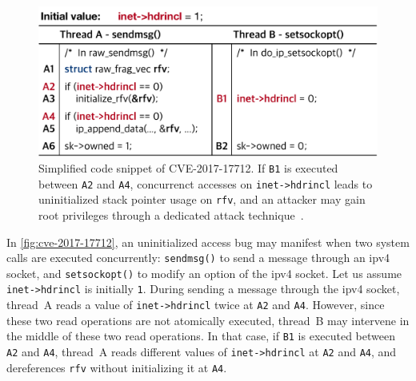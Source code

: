 %
\begin{figure}[t]
  \centering
  \includegraphics[width=0.85\linewidth]{fig/cve-2017-10661.pdf}
  \caption{Simplified code snippet of CVE-2017-17712. If \texttt{B1}
    is executed between \texttt{A2} and \texttt{A4}, concurrenct
    accesses on \texttt{inet->hdrincl} leads to uninitialized stack
    pointer usage on \texttt{rfv}, and an attacker may gain root
    privileges through a dedicated attack
    technique~\cite{stackspray}.}
  \label{fig:cve-2017-17712}
  \vspace{-8pt}
\end{figure}
%
In \autoref{fig:cve-2017-17712}, an uninitialized access bug may
manifest when two system calls are executed concurrently:
\texttt{sendmsg()} to send a message through an ipv4 socket, and
\texttt{setsockopt()} to modify an option of the ipv4 socket.
Let us assume \texttt{inet->hdrincl} is initially \texttt{1}.
%
During sending a message through the ipv4 socket, thread~A reads a
value of \texttt{inet->hdrincl} twice at \texttt{A2} and \texttt{A4}.
%
However, since these two read operations are not atomically executed,
thread~B may intervene in the middle of these two read operations.
%
In that case, if \texttt{B1} is executed between \texttt{A2} and
\texttt{A4}, thread~A reads different values of \texttt{inet->hdrincl}
at \texttt{A2} and \texttt{A4}, and dereferences \texttt{rfv} without
initializing it at \texttt{A4}.


